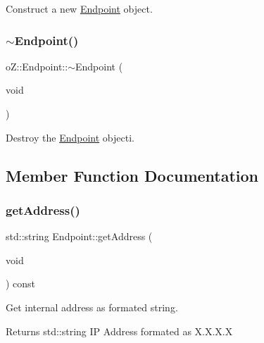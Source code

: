 Construct a new \mbox{\hyperlink{classo_z_1_1_endpoint}{Endpoint}} object. 

\mbox{\label{classo_z_1_1_endpoint_ae48da5e193017cb119233761406e7d54}} 
\subsubsection{\texorpdfstring{$\sim$Endpoint()}{~Endpoint()}}
{\footnotesize\ttfamily o\+Z\+::\+Endpoint\+::$\sim$\+Endpoint (\begin{DoxyParamCaption}\item[{void}]{ }\end{DoxyParamCaption})\hspace{0.3cm}{\ttfamily [default]}}



Destroy the \mbox{\hyperlink{classo_z_1_1_endpoint}{Endpoint}} objecti. 



\subsection{Member Function Documentation}
\mbox{\label{classo_z_1_1_endpoint_a27a680dbcdf1c89bb10fcbaca969edab}} 
\subsubsection{\texorpdfstring{getAddress()}{getAddress()}}
{\footnotesize\ttfamily std\+::string Endpoint\+::get\+Address (\begin{DoxyParamCaption}\item[{void}]{ }\end{DoxyParamCaption}) const\hspace{0.3cm}{\ttfamily [noexcept]}}



Get internal address as formated string. 

\begin{DoxyReturn}{Returns}
std\+::string IP Address formated as \textquotesingle{}X.\+X.\+X.\+X\textquotesingle{} 
\end{DoxyReturn}
\mbox{\label{classo_z_1_1_endpoint_ad02055ec457231d4d0f316dcfa5539ba}} 
